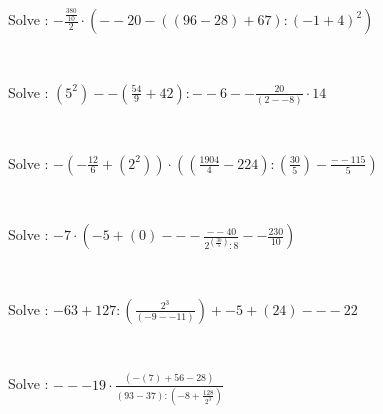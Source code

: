 \documentclass[english,course]{lecture}
\begin{document}
\begin{enumerate}
\begin{minipage}{\linewidth}
\item Solve : \(-\frac{\frac{380}{10}}{2} \cdot \left(--20-\left(\left(96-28\right)+67\right):{\left(-1+4\right)}^{2}\right)\)
\end{minipage} \\
\begin{minipage}{\linewidth}
\item Solve : \(\left({5}^{2}\right)--\left(\frac{54}{9}+42\right):--6--\frac{20}{\left(2--8\right)} \cdot 14\)
\end{minipage} \\
\begin{minipage}{\linewidth}
\item Solve : \(-\left(-\frac{12}{6}+\left({2}^{2}\right)\right) \cdot \left(\left(\frac{1904}{4}-224\right):\left(\frac{30}{5}\right)-\frac{--115}{5}\right)\)
\end{minipage} \\
\begin{minipage}{\linewidth}
\item Solve : \(-7 \cdot \left(-5+\left(0\right)---\frac{--40}{{2}^{\left(\frac{30}{5}\right)}:8}--\frac{230}{10}\right)\)
\end{minipage} \\
\begin{minipage}{\linewidth}
\item Solve : \(-63+127:\left(\frac{{2}^{3}}{\left(-9--11\right)}\right)+-5+\left(24\right)---22\)
\end{minipage} \\
\begin{minipage}{\linewidth}
\item Solve : \(---19 \cdot \frac{\left(-\left(7\right)+56-28\right)}{\left(93-37\right):\left(-8+\frac{128}{{2}^{3}}\right)}\)
\end{minipage} \\
\end{enumerate}
\end{document}
